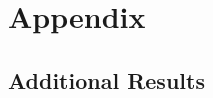 \section{Appendix}\label{sec:Appendix A}

\subsection{Additional Results}\label{app:additional_results}
